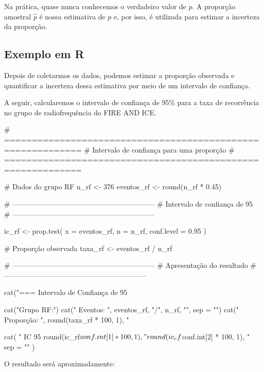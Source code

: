 \begin{deepdive}

Na prática, quase nunca conhecemos o verdadeiro valor de $p$. A proporção
amostral $\hat{p}$ é nossa estimativa de $p$ e, por isso, é utilizada para
estimar a incerteza da proporção.
\end{deepdive}

\subsection{Exemplo em R}

Depois de coletarmos os dados, podemos estimar a proporção observada e quantificar a incerteza dessa estimativa por meio de um intervalo de confiança.

A seguir, calcularemos o intervalo de confiança de 95\% para a taxa de recorrência no grupo de radiofrequência do FIRE AND ICE.

\begin{code}
# ============================================================
# Intervalo de confiança para uma proporção
# ============================================================

# Dados do grupo RF
n_rf <- 376
eventos_rf <- round(n_rf * 0.45)

# ------------------------------------------------------------
# Intervalo de confiança de 95%
# ------------------------------------------------------------

ic_rf <- prop.test(
  x = eventos_rf,
  n = n_rf,
  conf.level = 0.95
)

# Proporção observada
taxa_rf <- eventos_rf / n_rf

# ------------------------------------------------------------
# Apresentação do resultado
# ------------------------------------------------------------

cat("=== Intervalo de Confiança de 95%

cat("Grupo RF:\n")
cat("  Eventos: ", eventos_rf, "/", n_rf, "\n", sep = "")
cat("  Proporção: ", round(taxa_rf * 100, 1), "%

cat(
  "  IC 95%
  round(ic_rf$conf.int[1] * 100, 1),
  "%
  round(ic_rf$conf.int[2] * 100, 1),
  "%
  sep = ""
)
\end{code}

O resultado será aproximadamente:

